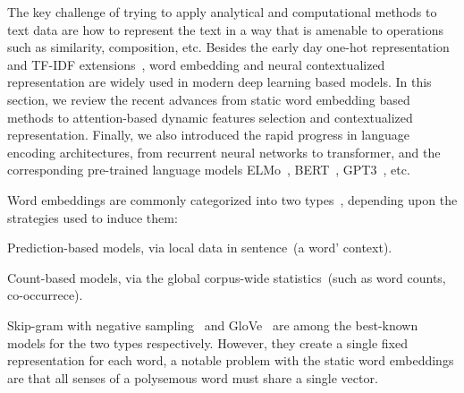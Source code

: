 The key challenge of trying to apply analytical and computational
methods to text data are how to represent the text in a way that is
amenable to operations such as similarity, composition, etc. Besides
the early day one-hot representation and TF-IDF
extensions~\citep{jones1972statistical}, word embedding and neural
contextualized representation are widely used in modern deep learning
based models. In this section, we review the recent advances from
static word embedding based methods to attention-based dynamic
features selection and contextualized representation. Finally, we also
introduced the rapid progress in language encoding architectures, from
recurrent neural networks to transformer, and the corresponding
pre-trained language models ELMo~\citep{elmo},
BERT~\citep{devlin2018bert}, GPT3~\cite{brown2020language}, etc.

Word embeddings are commonly categorized into two
types~\citep{Baroni:2014,pennington2014glove,li2015generative},
depending upon the strategies used to induce them:
\begin{inparaenum}[(1)]
\item Prediction-based models, via local data in sentence~(a word'
  context).
\item Count-based models, via the global corpus-wide statistics~(such
  as word counts, co-occurrece).
\end{inparaenum}

Skip-gram with negative sampling~\cite[SGNS,][]{mikolov13w2v} and
GloVe~\cite{pennington2014glove} are among the best-known models for
the two types respectively. However, they create a single fixed
representation for each word, a notable problem with the static word
embeddings are that all senses of a polysemous word must share a single
vector.

